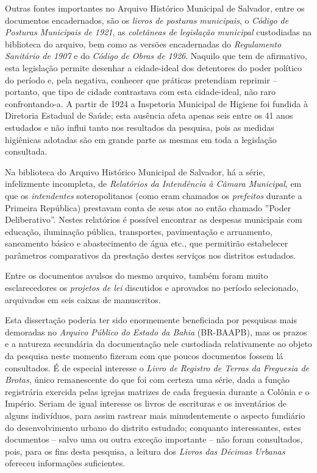 Outras fontes importantes no Arquivo Histórico Municipal de Salvador, entre os documentos encadernados, são os \textit{livros de posturas municipais}, o \textit{Código de Posturas Municipais de 1921}, as \textit{coletâneas de legislação municipal} custodiadas na biblioteca do arquivo, bem como as versões encadernadas do \textit{Regulamento Sanitário de 1907} e do \textit{Código de Obras de 1926}. Naquilo que tem de afirmativo, esta legislação permite desenhar a cidade-ideal dos detentores do poder político do período e, pela negativa, conhecer que práticas pretendiam reprimir -- portanto, que tipo de cidade contrastava com esta cidade-ideal, não raro confrontando-a. A partir de 1924 a Inspetoria Municipal de Higiene foi fundida à Diretoria Estadual de Saúde; esta ausência afeta apenas seis entre os 41 anos estudados e não influi tanto nos resultados da pesquisa, pois as medidas higiênicas adotadas são em grande parte as mesmas em toda a legislação consultada.

Na biblioteca do Arquivo Histórico Municipal de Salvador, há a série, infelizmente incompleta, de \textit{Relatórios da Intendência à Câmara Municipal}, em que os \textit{intendentes} soteropolitanos (como eram chamados os \textit{prefeitos} durante a Primeira República) prestavam conta de seus atos ao então chamado ''Poder Deliberativo''. Nestes relatórios é possível encontrar as despesas municipais com educação, iluminação pública, transportes, pavimentação e arruamento, saneamento básico e abastecimento de água etc., que permitirão estabelecer parâmetros comparativos da prestação destes serviços nos distritos estudados.

Entre os documentos avulsos do mesmo arquivo, também foram muito esclarecedores os \textit{projetos de lei} discutidos e aprovados no período selecionado, arquivados em seis caixas de manuscritos.

Esta dissertação poderia ter sido enormemente beneficiada por pesquisas mais demoradas no \textit{Arquivo Público do Estado da Bahia} (BR-BAAPB), mas os prazos e a natureza secundária da documentação nele custodiada relativamente ao objeto da pesquisa neste momento fizeram com que poucos documentos fossem lá consultados. É de especial interesse o \textit{Livro de Registro de Terras da Freguesia de Brotas}, único remanescente do que foi com certeza uma série, dada a função registrária exercida pelas igrejas matrizes de cada freguesia durante a Colônia e o Império. Seriam de igual interesse os livros de escrituras e os inventários de alguns indivíduos, para assim rastrear mais minudentemente o aspecto fundiário do desenvolvimento urbano do distrito estudado; conquanto interessantes, estes documentos -- salvo uma ou outra exceção importante -- não foram consultados, pois, para os fins desta pesquisa, a leitura dos \textit{Livros das Décimas Urbanas} ofereceu informações suficientes.

